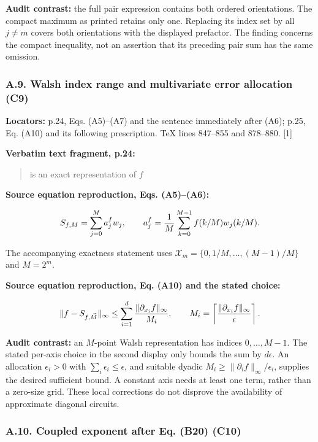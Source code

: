 \textbf{Audit contrast:} the full pair expression contains both ordered
orientations. The compact maximum as printed retains only one. Replacing
its index set by all \(j\ne m\) covers both orientations with the
displayed prefactor. The finding concerns the compact inequality, not an
assertion that its preceding pair sum has the same omission.

\subsubsection{A.9. Walsh index range and multivariate error allocation
(C9)}\label{a.9.-walsh-index-range-and-multivariate-error-allocation-c9}

\textbf{Locators:} p.24, Eqs. (A5)--(A7) and the sentence immediately
after (A6); p.25, Eq. (A10) and its following prescription. TeX lines
847--855 and 878--880. {[}1{]}

\textbf{Verbatim text fragment, p.24:}

\begin{quote}
is an exact representation of \(f\)
\end{quote}

\textbf{Source equation reproduction, Eqs. (A5)--(A6):}

\[
S_{f,M}=\sum_{j=0}^{M}a_j^f w_j,
\qquad
a_j^f={1\over M}\sum_{k=0}^{M-1}f(k/M)w_j(k/M).
\]

The accompanying exactness statement uses
\(\mathcal X_m=\{0,1/M,\ldots,(M-1)/M\}\) and \(M=2^m\).

\textbf{Source equation reproduction, Eq. (A10) and the stated choice:}

\[
\|f-S_{f,\vec M}\|_\infty
\leq\sum_{i=1}^{d}{\|\partial_{x_i}f\|_\infty\over M_i},
\qquad
M_i=\left\lceil{\|\partial_{x_i}f\|_\infty\over\epsilon}\right\rceil.
\]

\textbf{Audit contrast:} an \(M\)-point Walsh representation has indices
\(0,\ldots,M-1\). The stated per-axis choice in the second display only
bounds the sum by \(d\epsilon\). An allocation \(\epsilon_i>0\) with
\(\sum_i\epsilon_i\leq\epsilon\), and suitable dyadic
\(M_i\geq\|\partial_i f\|_\infty/\epsilon_i\), supplies the desired
sufficient bound. A constant axis needs at least one term, rather than a
zero-size grid. These local corrections do not disprove the availability
of approximate diagonal circuits.

\subsubsection{A.10. Coupled exponent after Eq. (B20)
(C10)}\label{a.10.-coupled-exponent-after-eq.-b20-c10}

